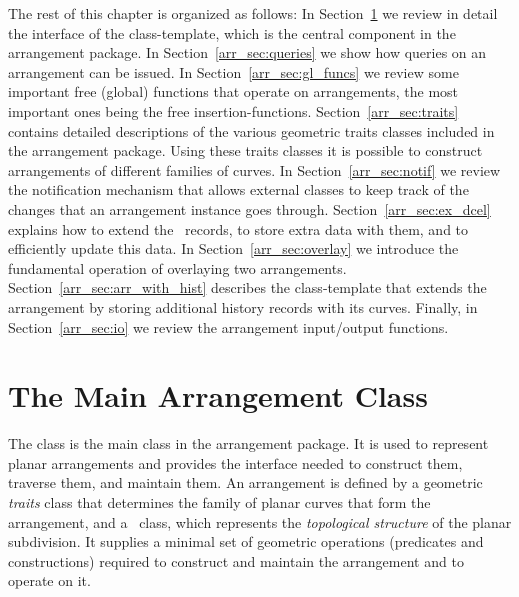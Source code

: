 The rest of this chapter is organized as follows: In
Section~\ref{arr_sec:arr_class} we review in detail the interface
of the  class-template, which is the central
component in the arrangement package. In
Section~\ref{arr_sec:queries} we show how queries on an arrangement
can be issued. In Section~\ref{arr_sec:gl_funcs} we
review some important free (global) functions that operate on
arrangements, the most important ones being the free 
insertion-functions. Section~\ref{arr_sec:traits} contains detailed
descriptions of the various geometric traits classes included in
the arrangement package. Using these traits classes it is possible
to construct arrangements of different families of curves. In
Section~\ref{arr_sec:notif} we review the notification mechanism
that allows external classes to keep track of the changes that an
arrangement instance goes through. Section~\ref{arr_sec:ex_dcel}
explains how to extend the \dcel\ records, to store extra data
with them, and to efficiently update this data.
In Section~\ref{arr_sec:overlay} we introduce the fundamental
operation of overlaying two arrangements.
Section~\ref{arr_sec:arr_with_hist} describes the
 class-template that extends the
arrangement by storing additional history records with its curves.
Finally, in Section~\ref{arr_sec:io} we review the arrangement
input/output functions.

\section{The Main Arrangement Class}
\label{arr_sec:arr_class}
%
The class  is the main class in
the arrangement package. It is used to represent planar
arrangements and provides the interface needed to construct them,
traverse them, and maintain them. An arrangement is defined by
a geometric {\em traits} class that determines the family of planar
curves that form the arrangement, and a \dcel\ class, which
represents the {\em topological structure} of the planar subdivision.
It supplies a minimal set of geometric operations (predicates and
constructions) required to construct and maintain the arrangement
and to operate on it.

